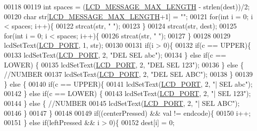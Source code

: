\begin{DoxyCode}
00118 
00119         \textcolor{keywordtype}{int} spaces = (\hyperlink{lcdmsg_8h_abe4c4b70fc6f44ae3680e5b2c68cdd00}{LCD\_MESSAGE\_MAX\_LENGTH} - strlen(dest))/2;
00120         \textcolor{keywordtype}{char} str[\hyperlink{lcdmsg_8h_abe4c4b70fc6f44ae3680e5b2c68cdd00}{LCD\_MESSAGE\_MAX\_LENGTH}+1] = \textcolor{stringliteral}{""};
00121         \textcolor{keywordflow}{for}(\textcolor{keywordtype}{int} i = 0; i < spaces; i++)\{
00122             strcat(str, \textcolor{stringliteral}{" "});
00123         \}
00124         strcat(str, dest);
00125         \textcolor{keywordflow}{for}(\textcolor{keywordtype}{int} i = 0; i < spaces; i++)\{
00126             strcat(str, \textcolor{stringliteral}{" "});
00127         \}
00128 
00129         lcdSetText(\hyperlink{lcdmsg_8h_abcf42bd88b3c36193f301ca25b033875}{LCD\_PORT}, 1, str);
00130 
00131         \textcolor{keywordflow}{if}(i > 0)\{
00132             \textcolor{keywordflow}{if}(c == UPPER)\{
00133                 lcdSetText(\hyperlink{lcdmsg_8h_abcf42bd88b3c36193f301ca25b033875}{LCD\_PORT}, 2, \textcolor{stringliteral}{"DEL    SEL   abc"});
00134             \} \textcolor{keywordflow}{else} \textcolor{keywordflow}{if}(c == LOWER) \{
00135                 lcdSetText(\hyperlink{lcdmsg_8h_abcf42bd88b3c36193f301ca25b033875}{LCD\_PORT}, 2, \textcolor{stringliteral}{"DEL    SEL   123"});
00136             \} \textcolor{keywordflow}{else} \{ \textcolor{comment}{//NUMBER}
00137                 lcdSetText(\hyperlink{lcdmsg_8h_abcf42bd88b3c36193f301ca25b033875}{LCD\_PORT}, 2, \textcolor{stringliteral}{"DEL    SEL   ABC"});
00138             \}
00139         \} \textcolor{keywordflow}{else} \{
00140             \textcolor{keywordflow}{if}(c == UPPER)\{
00141                 lcdSetText(\hyperlink{lcdmsg_8h_abcf42bd88b3c36193f301ca25b033875}{LCD\_PORT}, 2, \textcolor{stringliteral}{"|      SEL   abc"});
00142             \} \textcolor{keywordflow}{else} \textcolor{keywordflow}{if}(c == LOWER) \{
00143                 lcdSetText(\hyperlink{lcdmsg_8h_abcf42bd88b3c36193f301ca25b033875}{LCD\_PORT}, 2, \textcolor{stringliteral}{"|      SEL   123"});
00144             \} \textcolor{keywordflow}{else} \{ \textcolor{comment}{//NUMBER}
00145                 lcdSetText(\hyperlink{lcdmsg_8h_abcf42bd88b3c36193f301ca25b033875}{LCD\_PORT}, 2, \textcolor{stringliteral}{"|      SEL   ABC"});
00146             \}
00147         \}
00148 
00149         \textcolor{keywordflow}{if}((centerPressed) && val != endcode)\{
00150             i++;
00151         \} \textcolor{keywordflow}{else} \textcolor{keywordflow}{if}(leftPressed && i > 0)\{
00152             dest[i] = 0;

\end{DoxyCode}
